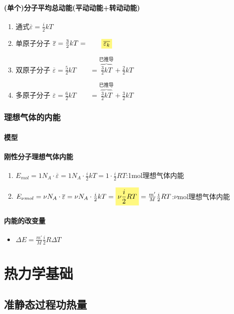 \documentclass[UTF8,a4paper,12pt,scheme=chinese]{ctexart}
\newcommand{\hla}[1]{%
	\colorbox{yellow!50}{$\displaystyle#1$}}
\begin{document}
	\paragraph{(单个)分子平均总动能(平动动能+转动动能)}
	\begin{enumerate}
		\item 通式$\overline{\varepsilon}=\frac{i}{2}kT$
		\item 单原子分子 $\overline{\varepsilon}=\frac{3}{2}kT=
		\qquad\hla{\overline{\varepsilon_k}}$
		\item 双原子分子 $\overline{\varepsilon}=\frac{5}{2}kT
		\qquad=
		\overbrace{\frac{3}{2}kT}
		^{\mbox{已推导}}
		+\frac{2}{2}kT
		$
		\item 多原子分子 $\overline{\varepsilon}=\frac{6}{2}kT
		\qquad=
		\overbrace{\frac{3}{2}kT}
		^{\mbox{已推导}}
		+\frac{3}{2}kT
		$
	\end{enumerate}
	\subsubsection{理想气体的内能}
	\paragraph{模型}
	\paragraph{刚性分子理想气体内能}
	\begin{enumerate}
		\item $E_{mol} = 1N_A\cdot\overline{\varepsilon} = 1N_A\cdot\frac{i}{2}kT = 1\cdot\frac{i}{2}RT$:\qquad 1mol理想气体内能
		\item $E_{\nu mol} = \nu N_A\cdot\overline{\varepsilon} = \nu N_A\cdot\frac{i}{2}kT = \hla{\nu\frac{i}{2}RT} = \frac{m'}{M}\frac{i}{2}RT$:\qquad $\nu$mol理想气体内能
	\end{enumerate}
	\paragraph{内能的改变量}
	\begin{itemize}
		\item $\Delta E = \frac{m'}{M}\frac{i}{2}R\Delta T$
	\end{itemize}
	\section{热力学基础}
	\subsection{准静态过程\quad 功\quad 热量}
\end{document}
